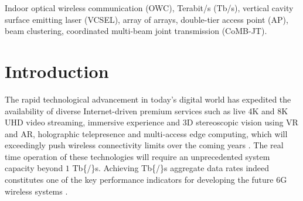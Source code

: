 \documentclass[lettersize,journal]{IEEEtran}
\begin{document}
\begin{IEEEkeywords}
Indoor optical wireless communication (OWC), Terabit/s (Tb/s), vertical cavity surface emitting laser (VCSEL), array of arrays, double-tier access point (AP), beam clustering, coordinated multi-beam joint transmission (CoMB-JT).
\end{IEEEkeywords}

\vspace{-5pt}

\section{Introduction} \label{Introduction}
The rapid technological advancement in today's digital world has expedited the availability of diverse Internet-driven premium services such as live 4K and 8K \ac{UHD} video streaming, immersive experience and \ac{3D} stereoscopic vision using \ac{VR} and \ac{AR}, holographic telepresence and multi-access edge computing, which will exceedingly push wireless connectivity limits over the coming years \cite{Giordani2020toward6G}. The real time operation of these technologies will require an unprecedented system capacity beyond $1$ \ac{Tb{/}s}. Achieving \ac{Tb{/}s} aggregate data rates indeed constitutes one of the key performance indicators for developing the future \ac{6G} wireless systems \cite{Strinati20196G}.
\end{document}
